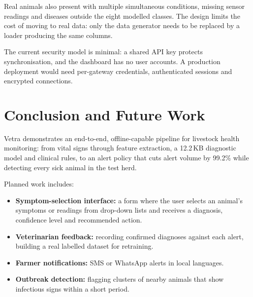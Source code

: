 \documentclass[conference]{IEEEtran}
\begin{document}
Real animals also present with multiple simultaneous conditions, missing sensor
readings and diseases outside the eight modelled classes. The design limits the
cost of moving to real data: only the data generator needs to be replaced by a
loader producing the same columns.

The current security model is minimal: a shared API key protects
synchronisation, and the dashboard has no user accounts. A production
deployment would need per-gateway credentials, authenticated sessions and
encrypted connections.

\section{Conclusion and Future Work}
Vetra demonstrates an end-to-end, offline-capable pipeline for livestock health
monitoring: from vital signs through feature extraction, a 12.2\,KB diagnostic
model and clinical rules, to an alert policy that cuts alert volume by 99.2\%
while detecting every sick animal in the test herd.

Planned work includes:
\begin{itemize}
\item \textbf{Symptom-selection interface:} a form where the user selects an
animal's symptoms or readings from drop-down lists and receives a diagnosis,
confidence level and recommended action.
\item \textbf{Veterinarian feedback:} recording confirmed diagnoses against each
alert, building a real labelled dataset for retraining.
\item \textbf{Farmer notifications:} SMS or WhatsApp alerts in local languages.
\item \textbf{Outbreak detection:} flagging clusters of nearby animals that show
infectious signs within a short period.
\end{itemize}
\end{document}
